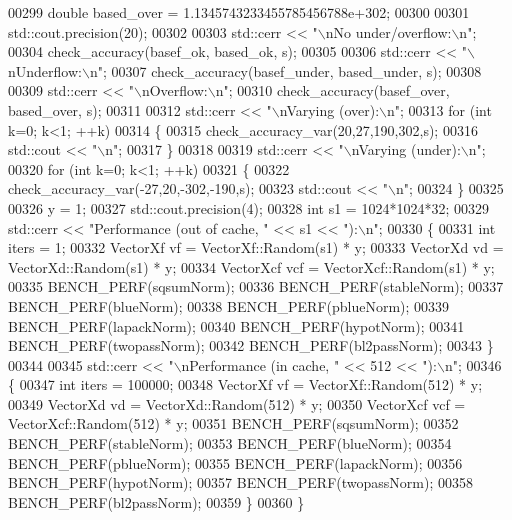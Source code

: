 \begin{DoxyCode}
00299   \textcolor{keywordtype}{double} based\_over = 1.1345743233455785456788e+302;
00300 
00301   std::cout.precision(20);
00302 
00303   std::cerr << \textcolor{stringliteral}{"\(\backslash\)nNo under/overflow:\(\backslash\)n"};
00304   check\_accuracy(basef\_ok, based\_ok, s);
00305 
00306   std::cerr << \textcolor{stringliteral}{"\(\backslash\)nUnderflow:\(\backslash\)n"};
00307   check\_accuracy(basef\_under, based\_under, s);
00308 
00309   std::cerr << \textcolor{stringliteral}{"\(\backslash\)nOverflow:\(\backslash\)n"};
00310   check\_accuracy(basef\_over, based\_over, s);
00311 
00312   std::cerr << \textcolor{stringliteral}{"\(\backslash\)nVarying (over):\(\backslash\)n"};
00313   \textcolor{keywordflow}{for} (\textcolor{keywordtype}{int} k=0; k<1; ++k)
00314   \{
00315     check\_accuracy\_var(20,27,190,302,s);
00316     std::cout << \textcolor{stringliteral}{"\(\backslash\)n"};
00317   \}
00318 
00319   std::cerr << \textcolor{stringliteral}{"\(\backslash\)nVarying (under):\(\backslash\)n"};
00320   \textcolor{keywordflow}{for} (\textcolor{keywordtype}{int} k=0; k<1; ++k)
00321   \{
00322     check\_accuracy\_var(-27,20,-302,-190,s);
00323     std::cout << \textcolor{stringliteral}{"\(\backslash\)n"};
00324   \}
00325 
00326   y = 1;
00327   std::cout.precision(4);
00328   \textcolor{keywordtype}{int} s1 = 1024*1024*32;
00329   std::cerr << \textcolor{stringliteral}{"Performance (out of cache, "} << s1 << \textcolor{stringliteral}{"):\(\backslash\)n"};
00330   \{
00331     \textcolor{keywordtype}{int} iters = 1;
00332     VectorXf vf = VectorXf::Random(s1) * y;
00333     VectorXd vd = VectorXd::Random(s1) * y;
00334     VectorXcf vcf = VectorXcf::Random(s1) * y;
00335     BENCH\_PERF(sqsumNorm);
00336     BENCH\_PERF(stableNorm);
00337     BENCH\_PERF(blueNorm);
00338     BENCH\_PERF(pblueNorm);
00339     BENCH\_PERF(lapackNorm);
00340     BENCH\_PERF(hypotNorm);
00341     BENCH\_PERF(twopassNorm);
00342     BENCH\_PERF(bl2passNorm);
00343   \}
00344 
00345   std::cerr << \textcolor{stringliteral}{"\(\backslash\)nPerformance (in cache, "} << 512 << \textcolor{stringliteral}{"):\(\backslash\)n"};
00346   \{
00347     \textcolor{keywordtype}{int} iters = 100000;
00348     VectorXf vf = VectorXf::Random(512) * y;
00349     VectorXd vd = VectorXd::Random(512) * y;
00350     VectorXcf vcf = VectorXcf::Random(512) * y;
00351     BENCH\_PERF(sqsumNorm);
00352     BENCH\_PERF(stableNorm);
00353     BENCH\_PERF(blueNorm);
00354     BENCH\_PERF(pblueNorm);
00355     BENCH\_PERF(lapackNorm);
00356     BENCH\_PERF(hypotNorm);
00357     BENCH\_PERF(twopassNorm);
00358     BENCH\_PERF(bl2passNorm);
00359   \}
00360 \}
\end{DoxyCode}
